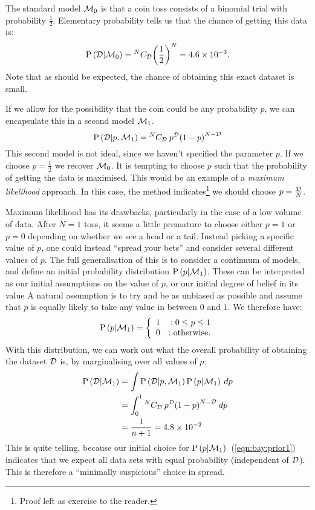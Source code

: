 The standard model $\mathcal{M}_0$ is that a coin toss consists of a binomial trial with probability $\frac{1}{2}$. Elementary probability tells us that the chance of getting this data is:
\begin{equation}
  \mathrm{P}\left(\mathcal{D}\middle|\mathcal{M}_0\right)= {^{N}C_{\mathcal{D}}} {\left( \frac{1}{2} \right)}^{N}  = 4.6\times 10^{-3}.
  \label{eqn:bay:M0}
\end{equation}
Note that as should be expected, the chance of obtaining this exact dataset is small. 

If we allow for the possibility that the coin could be any probability $p$, we can encapsulate this in a second model $\mathcal{M}_1$.
\begin{equation}
  \mathrm{P}\left(\mathcal{D}\middle|p,\mathcal{M}_1\right)= {^{N}C_{\mathcal{D}}}\: {p}^{\mathcal{D}} {\left(1 - p \right)}^{N-\mathcal{D}} 
  \label{eqn:bay:M1}
\end{equation}
This second model is not ideal, since we haven't specified the parameter $p$. If we choose $p=\frac{1}{2}$ we recover $\mathcal{M}_0$. It is tempting to choose $p$ such that the probability of getting the data is maximised. This would be an example of a {\em maximum likelihood\/} approach. In this case, the method indicates\footnote{Proof left as exercise to the reader.} we should choose $p = \frac{\mathcal{D}}{N}$. 

Maximum likelihood has its drawbacks, particularly in the case of a low volume of data. After $N=1$ toss, it seems a little premature to choose either $p=1$ or $p=0$ depending on whether we see a head or a tail. Instead picking a specific value of $p$, one could instead ``spread your bets'' and consider several different values of $p$. The full generalisation of this is to consider a continuum of models, and define an initial probability distribution $\mathrm{P}\left(p\middle|\mathcal{M}_1\right)$. These can be interpreted as our initial assumptions on the value of $p$, or our initial degree of belief in its value
A natural assumption is to try and be as unbiased as possible and assume that $p$ is equally likely to take any value in between $0$ and $1$. We therefore have:
\begin{equation}
  \mathrm{P}\left(p\middle|\mathcal{M}_1\right)=\left\{
  \begin{array}{lr}
    1 &:0\le p\le1\\
    0 &:\text{otherwise.}\\
  \end{array}
  \right.\label{eqn:bay:prior1}
\end{equation}
With this distribution, we can work out what the overall probability of obtaining the dataset $\mathcal{D}$ is, by marginalising over all values of $p$:
\begin{align}
  \mathrm{P}\left(\mathcal{D}\middle|\mathcal{M}_1\right) 
  &= \int \mathrm{P}\left(\mathcal{D}\middle|p,\mathcal{M}_1\right)\mathrm{P}\left(p\middle|\mathcal{M}_1\right)\: dp \\
  &= \int_0^1 {^{N}C_{\mathcal{D}}}\: {p}^{\mathcal{D}} {\left(1 - p \right)}^{N-\mathcal{D}}\: dp \\
  &= \frac{1}{n+1} = 4.8\times10^{-2}
  \label{eqn:bay:marg}
\end{align}
This is quite telling, because our initial choice for $\mathrm{P}\left(p\middle|\mathcal{M}_1\right)$~(\ref{eqn:bay:prior1}) indicates that we expect all data sets with equal probability (independent of $\mathcal{D}$). This is therefore a ``minimally suspicious'' choice in spread.

